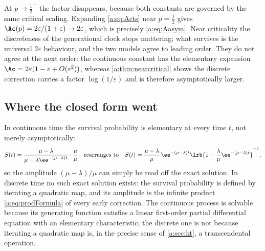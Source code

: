 At $p\to\tfrac12^-$ the factor disappears, because both constants are governed by
the same critical scaling. Expanding \cref{a:eq:Acts} near $p=\tfrac12$ gives
$\Ac(p) = 2\varepsilon/(1+\varepsilon)\to2\varepsilon$, which is precisely
\cref{a:eq:Aasym}. Near criticality the discreteness of the generational clock
stops mattering; what survives is the universal $2\varepsilon$ behaviour, and the
two models agree to leading order. They do not agree at the next order: the
continuous constant has the elementary expansion
$\Ac = 2\varepsilon(1-\varepsilon+O(\varepsilon^2))$, whereas
\cref{a:thm:nearcritical} shows the discrete correction carries a factor
$\log(1/\varepsilon)$ and is therefore asymptotically larger.

\subsection*{Where the closed form went}

In continuous time the survival probability is elementary at every
time $t$, not merely asymptotically:
\begin{equation}
\label{a:eq:ctsSagain}
S(t) = \frac{\mu-\lambda}{\mu-\lambda\ee^{-(\mu-\lambda)t}}\cdot\frac{\mu}{\mu}
\quad\text{rearranges to}\quad
S(t) = \frac{\mu-\lambda}{\mu}\,\ee^{-(\mu-\lambda)t}
\lrb{1-\frac{\lambda}{\mu}\ee^{-(\mu-\lambda)t}}^{-1},
\end{equation}
so the amplitude $(\mu-\lambda)/\mu$ can simply be read off the exact solution.
In discrete time no such exact solution exists: the survival probability is defined
by iterating a quadratic map, and its amplitude is the infinite product
\cref{a:eq:prodFormula} of every early correction. The continuous process is
solvable because its generating function satisfies a linear first-order partial
differential equation with an elementary characteristic; the discrete one is not
because iterating a quadratic map is, in the precise sense of \cref{a:sec:ht}, a
transcendental operation.
